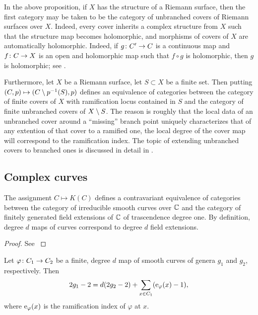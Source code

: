 \begin{rmk}
 In the above proposition, if $X$ has the structure of a Riemann surface, then the first category may be taken to be the category of unbranched covers of Riemann surfaces over $X$. Indeed, every cover inherits a complex structure from $X$ such that the structure map becomes holomorphic, and morphisms of covers of $X$ are automatically holomorphic. Indeed, if $g\colon C'\to C$ is a continuous map and $f\colon C\to X$ is an open and holomorphic map such that $f\circ g$ is holomorphic, then $g$ is holomorphic; see \cite[1.3.7]{Lamotke2005}.
 
 Furthermore, let $X$ be a Riemann surface, let $S\subset X$ be a finite set. Then putting $(C,p)\mapsto (C\setminus p^{-1}(S),p)$ defines an equivalence of categories between the category of finite covers of $X$ with ramification locus contained in $S$ and the category of finite unbranched covers of $X\setminus S$. The reason is roughly that the local data of an unbranched cover around a ``missing'' branch point uniquely characterizes that of any extention of that cover to a ramified one, \eg the local degree of the cover map will correspond to the ramification index. The topic of extending unbranched covers to branched ones is discussed in detail in \cite[4.6]{Lamotke2005}.
\end{rmk}


\subsection{Complex curves}

\begin{prop} \label{prop:curves-to-fields}
 The assignment $C\mapsto K(C)$ defines a contravariant equivalence of categories between the category of irreducible smooth curves over $\mathbb{C}$ 
and the 
category of finitely generated field extensions of $\mathbb{C}$ of trascendence degree one. By definition, degree $d$ maps of curves correspond 
to degree $d$ field extensions.
\end{prop}

\begin{proof}
 See \cite[pp.20-22]{Silverman2009}
\end{proof}

\begin{prop} \label{prop:hurwitz}
 Let $\varphi \colon C_1 \to C_2$ be a finite, degree $d$ map of smooth curves of genera $g_1$ and $g_2$, respectively. Then \[2g_1-2 = d(2g_2-2) + 
\sum_{x\in C_1}(\operatorname{e}_{\varphi}(x)-1),\] where $\operatorname{e}_\varphi(x)$ is the ramification index of $\varphi$ at $x$.
\end{prop}

